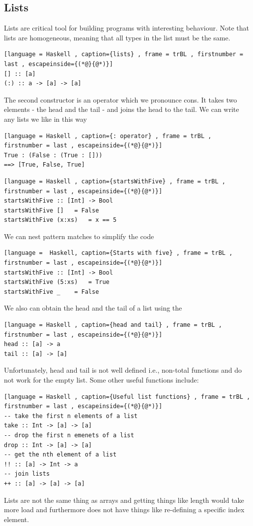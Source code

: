 \documentclass[a4paper]{article}
\theoremstyle{plain}
\theoremstyle{definition}
\theoremstyle{remark}
\begin{document}
\subsection{Lists}
Lists are critical tool for building programs with interesting behaviour. Note that lists are homogeneous, meaning that all types in the list must be the same.
\begin{lstlisting}[language = Haskell , caption={lists} , frame = trBL , firstnumber = last , escapeinside={(*@}{@*)}]
[] :: [a]
(:) :: a -> [a] -> [a]
\end{lstlisting}
The second constructor is an operator which we pronounce cons. It takes two elements - the head and the tail - and joins the head to the tail. We can write any lists we like in this way
\begin{lstlisting}[language = Haskell , caption={: operator} , frame = trBL , firstnumber = last , escapeinside={(*@}{@*)}]
True : (False : (True : []))
==> [True, False, True]
\end{lstlisting}
\begin{lstlisting}[language = Haskell , caption={startsWithFive} , frame = trBL , firstnumber = last , escapeinside={(*@}{@*)}]
startsWithFive :: [Int] -> Bool
startsWithFive [] 	= False
startsWithFive (x:xs)	= x == 5
\end{lstlisting}
We can nest pattern matches to simplify the code
\begin{lstlisting}[language =  Haskell, caption={Starts with five} , frame = trBL , firstnumber = last , escapeinside={(*@}{@*)}]
startsWithFive :: [Int] -> Bool
startsWithFive (5:xs)	= True
startsWithFive _	= False
\end{lstlisting}
We also can obtain the head and the tail of a list using the
\begin{lstlisting}[language = Haskell , caption={head and tail} , frame = trBL , firstnumber = last , escapeinside={(*@}{@*)}]
head :: [a] -> a
tail :: [a] -> [a]
\end{lstlisting}
Unfortunately, head and tail is not well defined i.e., non-total functions and do not work for the empty list. Some other useful functions include:
\begin{lstlisting}[language = Haskell , caption={Useful list functions} , frame = trBL , firstnumber = last , escapeinside={(*@}{@*)}]
-- take the first n elements of a list
take :: Int -> [a] -> [a]
-- drop the first n emenets of a list
drop :: Int -> [a] -> [a]
-- get the nth element of a list
!! :: [a] -> Int -> a
-- join lists
++ :: [a] -> [a] -> [a]
\end{lstlisting}
Lists are not the same thing as arrays and getting things like length would take more load and furthermore does not have things like re-defining a specific index element. 
\end{document}

